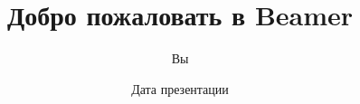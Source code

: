 \documentclass{beamer}
\title{Добро пожаловать в Beamer}
\author{Вы}
\institute{Откуда вы приехали}
\date{Дата презентации}
\begin{document}
\begin{frame}
\titlepage %
\end{frame}
\end{document}
